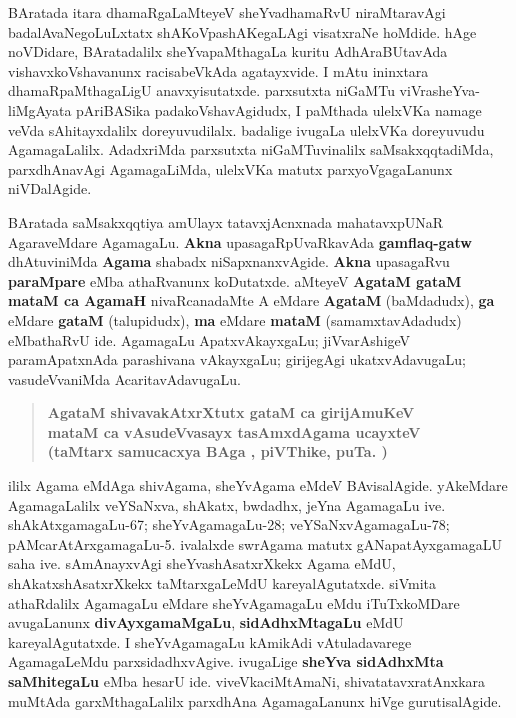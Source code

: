 BAratada itara dhamaRgaLaMteyeV sheYvadhamaRvU niraMtaravAgi badalAvaNegoLuLxtatx shAKoVpashAKegaLAgi visatxraNe hoMdide. hAge noVDidare, BAratadalilx sheYvapaMthagaLa kuritu AdhAraBUtavAda vishavxkoVshavanunx racisabeVkAda agatayxvide. I mAtu \hbox{ininxtara} dhamaRpaMthagaLigU anavxyisutatxde. parxsutxta niGaMTu viVrasheYva-liMgAyata pAriBASika padakoVshavAgidudx, I paMthada ulelxVKa namage veVda sAhitayxdalilx doreyuvudilalx. badalige ivugaLa ulelxVKa doreyuvudu AgamagaLalilx. AdadxriMda parxsutxta niGaMTu\-vinalilx saMsakxqqtadiMda, parxdhAnavAgi AgamagaLiMda, ulelxVKa matutx parxyoVgagaLanunx niVDalAgide.

BAratada saMsakxqqtiya amUlayx tatavxjAcnxnada mahatavxpUNaR AgaraveMdare AgamagaLu. \textbf{Akna} upasagaRpUvaRkavAda \textbf{gamflaq-gatw} dhAtuviniMda \textbf{Agama} shabadx niSapxnanxvAgide. \textbf{Akna} upasagaRvu \textbf{paraMpare} eMba athaRvanunx koDutatxde. aMteyeV \textbf{AgataM gataM mataM ca AgamaH} nivaRcanadaMte A eMdare \textbf{AgataM} (baMdadudx), \textbf{ga} eMdare \textbf{gataM} (talupidudx), \textbf{ma} eMdare \textbf{mataM} (samamxtavAdadudx) eMbathaRvU ide. AgamagaLu ApatxvAkayxgaLu; jiVvarAshigeV paramApatxnAda parashivana vAkayxgaLu; girijegAgi ukatxvAdavugaLu; vasu\-deVvaniMda AcaritavAdavugaLu.
\begin{verse}
\textbf{AgataM shivavakAtxrXtutx gataM ca girijAmuKeV}\\[3pt]
\textbf{mataM ca vAsudeVvasayx tasAmxdAgama ucayxteV}\\[3pt]
\textbf{(taMtarx samucacxya BAga , piVThike, puTa. )}
\end{verse}

\noindent
ililx Agama eMdAga shivAgama, sheYvAgama eMdeV BAvisalAgide. yAkeMdare AgamagaLalilx veYSaNxva, shAkatx, bwdadhx, jeYna AgamagaLu ive. shAkAtxgamagaLu-67; sheYvAgamagaLu-28; veYSaNxvAgamagaLu-78; pAMcarAtArxgamagaLu-5. ivalalxde  swrAgama matutx gANapatAyxgamagaLU saha ive. sAmAnayxvAgi sheYvashAsatxrXkekx Agama eMdU, shAkatxshAsatxrXkekx taMtarxgaLeMdU kareyalAgutatxde. siVmita athaRdalilx AgamagaLu eMdare sheYvAgamagaLu eMdu iTuTxkoMDare avugaLanunx \textbf{divAyxgamaMgaLu}, \textbf{sidAdhxMtagaLu} eMdU kareya\-lAgutatxde. I sheYvAgamagaLu kAmikAdi vAtuladavarege  AgamagaLeMdu parxsidadhxvAgive. ivugaLige \textbf{sheYva sidAdhxMta saMhitegaLu} eMba hesarU ide. viveVkaciMtAmaNi, shivatatavxratAnxkara muMtAda garxMthagaLalilx parxdhAna AgamagaLanunx hiVge gurutisalAgide.

